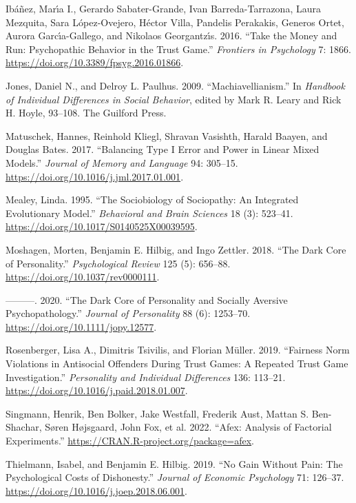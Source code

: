 \documentclass[
]{article}
\newlength{\cslhangindent}
\newenvironment{CSLReferences}[2] %
 {\begin{list}{}{%
  \setlength{\itemindent}{0pt}
  \setlength{\leftmargin}{0pt}
  \setlength{\parsep}{0pt}
  \ifodd #1
   \setlength{\leftmargin}{\cslhangindent}
   \setlength{\itemindent}{-1\cslhangindent}
  \fi
  \setlength{\itemsep}{#2\baselineskip}}}
 {\end{list}}
\begin{document}
\begin{CSLReferences}{1}{0}
Ibáñez, Marı́a I., Gerardo Sabater-Grande, Ivan Barreda-Tarrazona, Laura Mezquita, Sara López-Ovejero, Héctor Villa, Pandelis Perakakis, Generos Ortet, Aurora Garcı́a-Gallego, and Nikolaos Georgantzı́s. 2016. {``Take the Money and Run: {Psychopathic} Behavior in the Trust Game.''} \emph{Frontiers in Psychology} 7: 1866. \url{https://doi.org/10.3389/fpsyg.2016.01866}.

Jones, Daniel N., and Delroy L. Paulhus. 2009. {``{Machiavellianism}.''} In \emph{Handbook of Individual Differences in Social Behavior}, edited by Mark R. Leary and Rick H. Hoyle, 93--108. The Guilford Press.

Matuschek, Hannes, Reinhold Kliegl, Shravan Vasishth, Harald Baayen, and Douglas Bates. 2017. {``Balancing {Type I} Error and Power in Linear Mixed Models.''} \emph{Journal of Memory and Language} 94: 305--15. \url{https://doi.org/10.1016/j.jml.2017.01.001}.

Mealey, Linda. 1995. {``The Sociobiology of Sociopathy: {An} Integrated Evolutionary Model.''} \emph{Behavioral and Brain Sciences} 18 (3): 523--41. \url{https://doi.org/10.1017/S0140525X00039595}.

Moshagen, Morten, Benjamin E. Hilbig, and Ingo Zettler. 2018. {``The Dark Core of Personality.''} \emph{Psychological Review} 125 (5): 656--88. \url{https://doi.org/10.1037/rev0000111}.

---------. 2020. {``The Dark Core of Personality and Socially Aversive Psychopathology.''} \emph{Journal of Personality} 88 (6): 1253--70. \url{https://doi.org/10.1111/jopy.12577}.

Rosenberger, Lisa A., Dimitris Tsivilis, and Florian Müller. 2019. {``Fairness Norm Violations in Antisocial Offenders During Trust Games: {A} Repeated Trust Game Investigation.''} \emph{Personality and Individual Differences} 136: 113--21. \url{https://doi.org/10.1016/j.paid.2018.01.007}.

Singmann, Henrik, Ben Bolker, Jake Westfall, Frederik Aust, Mattan S. Ben-Shachar, Søren Højsgaard, John Fox, et al. 2022. {``Afex: Analysis of Factorial Experiments.''} \url{https://CRAN.R-project.org/package=afex}.

Thielmann, Isabel, and Benjamin E. Hilbig. 2019. {``No Gain Without Pain: {The} Psychological Costs of Dishonesty.''} \emph{Journal of Economic Psychology} 71: 126--37. \url{https://doi.org/10.1016/j.joep.2018.06.001}.


\end{CSLReferences}
\end{document}
